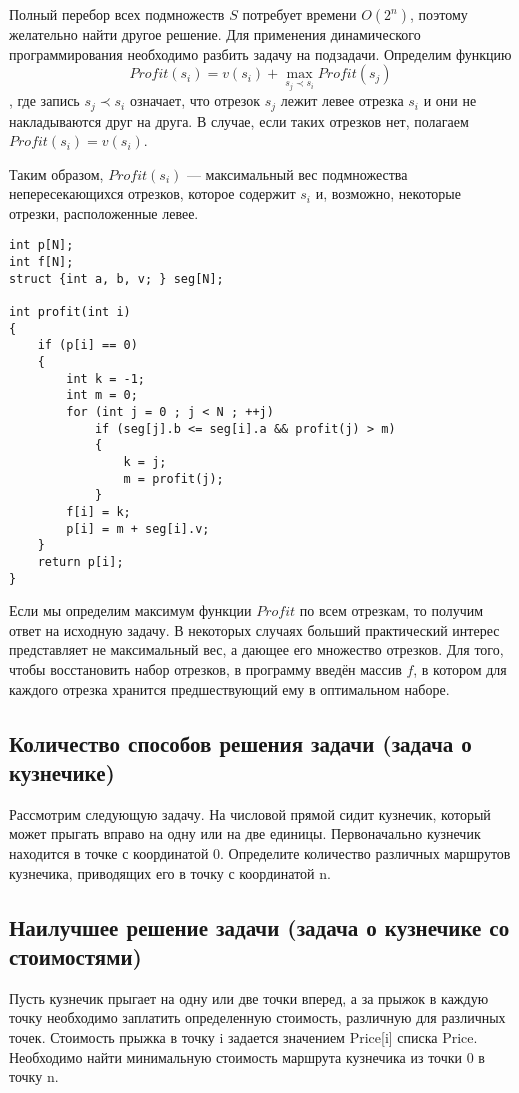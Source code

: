 \documentclass[14pt]{book}
\begin{document}
Полный перебор всех подмножеств $S$ потребует времени $O(2^n)$, поэтому желательно найти другое
решение. Для применения динамического программирования необходимо разбить задачу на подзадачи.
Определим функцию
$$Profit(s_i) = v(s_i) + \max_{s_j \prec s_i}Profit(s_j)$$,
где запись $s_j \prec s_i$ означает, что отрезок $s_j$ лежит левее отрезка $s_i$ и они
не накладываются друг на друга. В случае, если таких отрезков нет, полагаем
$Profit(s_i) = v(s_i)$.

Таким образом, $Profit(s_i)$ --- максимальный вес подмножества непересекающихся отрезков,
которое содержит $s_i$ и, возможно, некоторые отрезки, расположенные левее.

\begin{lstlisting}
int p[N];
int f[N];
struct {int a, b, v; } seg[N];

int profit(int i)
{
    if (p[i] == 0)
    {
        int k = -1;
        int m = 0;
        for (int j = 0 ; j < N ; ++j)
            if (seg[j].b <= seg[i].a && profit(j) > m)
            {
                k = j;
                m = profit(j);
            }
        f[i] = k;
        p[i] = m + seg[i].v;
    }
    return p[i];
}
\end{lstlisting}

Если мы определим максимум функции $Profit$ по всем отрезкам, то получим ответ на исходную задачу.
В некоторых случаях больший практический интерес представляет не максимальный вес, а дающее его
множество отрезков. Для того, чтобы восстановить набор отрезков, в программу введён массив $f$,
в котором для каждого отрезка хранится предшествующий ему в оптимальном наборе.

\subsection{Количество способов решения задачи (задача о кузнечике)}

Рассмотрим следующую задачу. На числовой прямой сидит кузнечик, который может прыгать вправо на одну или на две единицы. Первоначально кузнечик находится в точке с координатой 0. Определите количество различных маршрутов кузнечика, приводящих его в точку с координатой n.

\subsection{Наилучшее решение задачи (задача о кузнечике со стоимостями)}

Пусть кузнечик прыгает на одну или две точки вперед, а за прыжок в каждую точку необходимо заплатить определенную стоимость, различную для различных точек. Стоимость прыжка в точку i задается значением Price[i] списка Price. Необходимо найти минимальную стоимость маршрута кузнечика из точки 0 в точку n.
\end{document}
